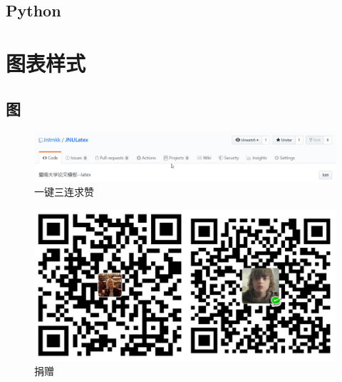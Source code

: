 \subsection{Python}

\clearpage
\section[图表样式]{图表样式}
\subsection{图}
\lipsum[1]
\begin{figure}[htbp]
    \centering
    \includegraphics[width=\textwidth]{image/star.png}
    \caption{一键三连求赞}
\end{figure}
\begin{figure}[htbp]
    \centering
    \includegraphics[scale=.3]{image/donate.jpg}
    \caption{捐赠}
\end{figure}
\lipsum[2]
